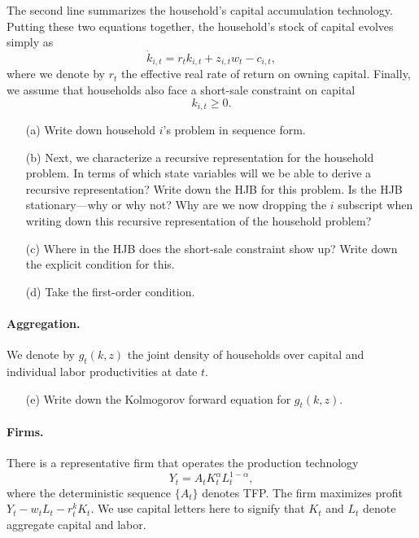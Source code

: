 \documentclass[11pt]{extarticle}
\theoremstyle{plain}
\theoremstyle{definition}
\begin{document}
The second line summarizes the household's capital accumulation technology. Putting these two equations together, the household's stock of capital evolves simply as  
\begin{equation*}
	\dot k_{i, t} = r_t k_{i, t} + z_{i, t} w_t - c_{i, t},
\end{equation*}
where we denote by $r_t$ the effective real rate of return on owning capital. Finally, we assume that households also face a short-sale constraint on capital
\begin{equation*}
	k_{i, t} \geq 0.
\end{equation*}


\begin{enumerate}
\item [(a)] Write down household $i$'s problem in sequence form. 

\item [(b)] Next, we characterize a recursive representation for the household problem. In terms of which state variables will we be able to derive a recursive representation? Write down the HJB for this problem. Is the HJB stationary---why or why not? Why are we now dropping the $i$ subscript when writing down this recursive representation of the household problem?

\item [(c)] Where in the HJB does the short-sale constraint show up? Write down the explicit condition for this. 

\item [(d)] Take the first-order condition.
\end{enumerate}


\paragraph{Aggregation.}
We denote by $g_t(k, z)$ the joint density of households over capital and individual labor productivities at date $t$. 

\begin{enumerate}
\item [(e)] Write down the Kolmogorov forward equation for $g_t(k, z)$. 
\end{enumerate}


\paragraph{Firms.}
There is a representative firm that operates the production technology 
\begin{equation*}
	Y_t = A_t K_t^\alpha L_t^{1-\alpha},
\end{equation*}
where the deterministic sequence $\{A_t\}$ denotes TFP. The firm maximizes profit $Y_t - w_t L_t - r_t^k K_t$. We use capital letters here to signify that $K_t$ and $L_t$ denote aggregate capital and labor. 
\end{document}
